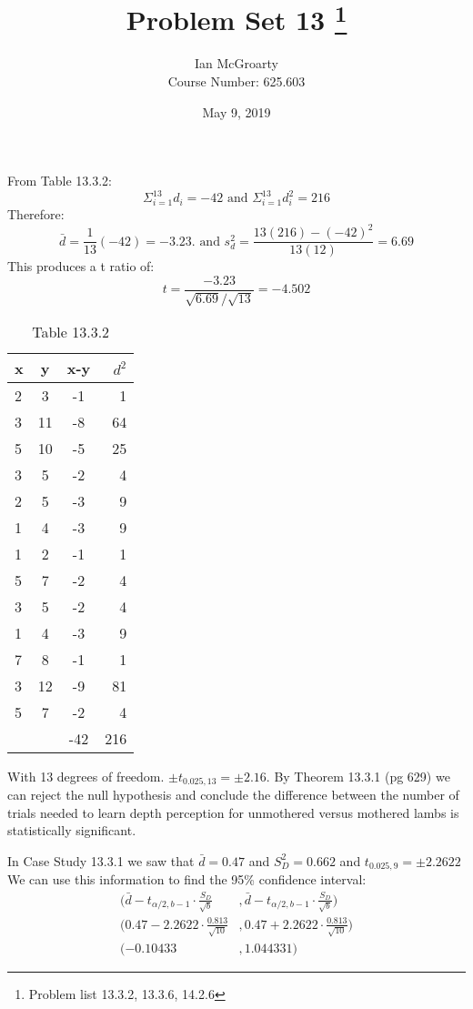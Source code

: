 \documentclass[12pt]{article}
\title{Problem Set 13 \thanks{Problem list 13.3.2, 13.3.6, 14.2.6 }}
\author{Ian McGroarty \\
	Course Number: 625.603}
\date{May 9, 2019}
\newenvironment{problem}[2][Problem]{\begin{trivlist}
\item[\hskip \labelsep {\bfseries #1}\hskip \labelsep {\bfseries #2.}]}{\end{trivlist}}
\begin{document}
\maketitle
\newpage

\begin{problem}{13.3.2} From Table 13.3.2:
$$ \Sigma_{i=1}^{13} d_i = -42 \text{ \ \ \     and  \ \ \   } \Sigma_{i=1}^{13} d_i^2 = 216 $$
Therefore: 
$$ \bar{d} = \frac{1}{13}(-42) = -3.23. \text{ \ \ \  and \ \ \ } s_d^2 = \frac{13(216)-(-42)^2}{13(12)}=6.69 $$
This produces a t ratio of:
$$ t = \frac{ -3.23 }{\sqrt{6.69}/\sqrt{13}} = -4.502$$
\end{problem}
\begin{table}[h!]
\centering
\begin{tabular}{lccr}
x  &	y   &	x-y &	$d^2$ \\
\hline
2  &	3  &	-1 &	1 \\
3  &	11  &	-8 &	64 \\
5  &	10  &	-5 &	25 \\
3  &	5   &	-2 &	4 \\
2  &	5   &	-3 &	9 \\
1  &	4  &	-3 &	9 \\
1  &	2  &	-1 &	1 \\
5  & 	7  &	-2 &	4 \\ 
3  &	 5  &	-2 &	4 \\
1  &	4  &	-3 &	9 \\
7  &	8  &	-1 &	1 \\
3  &	12 &	-9 &	81 \\ 
5  &	7 &	-2 &	4 \\
\hline
&  &		-42 &	216
\end{tabular}
\caption*	{Table 13.3.2}
\end{table}
With 13 degrees of freedom. $\pm t_{0.025,13} = \pm 2.16$. By Theorem 13.3.1 (pg 629) we can reject the null hypothesis and conclude the difference between the number of trials needed to learn depth perception for unmothered versus mothered lambs is statistically significant. 


\begin{problem}{13.3.6} In Case Study 13.3.1 we saw that $\bar{d} =0.47$ and $ S_D^2 = 0.662$ and $t_{0.025,9} = \pm 2.2622$ We can use this information to find the 95\% confidence interval: 
\begin{align*}
(\bar{d} - t_{\alpha/2 , b-1} \cdot \frac{S_D}{\sqrt{b}} &, \bar{d} - t_{\alpha/2 , b-1} \cdot \frac{S_D}{\sqrt{b}}) \\
(0.47 - 2.2622 \cdot \frac{0.813}{\sqrt{10}} &, 0.47 + 2.2622 \cdot \frac{0.813}{\sqrt{10}}) \\
(-0.10433 &, 1.044331) 
\end{align*}
\end{problem}
\end{document}
